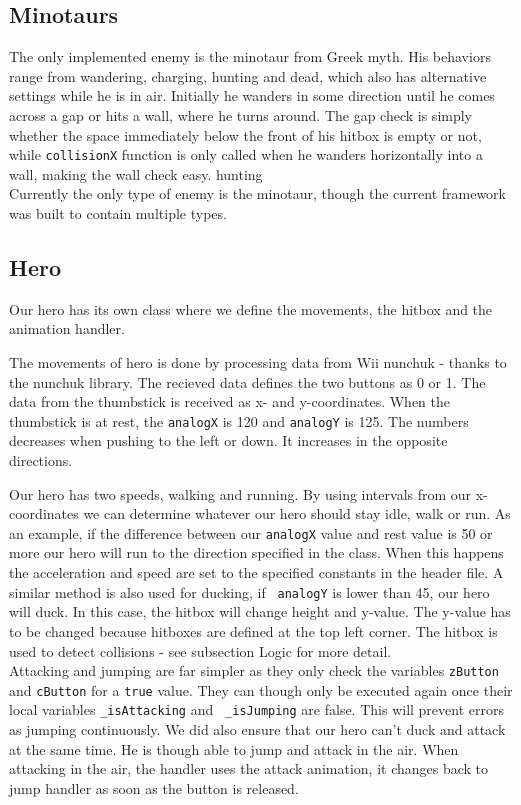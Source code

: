 \subsection{Minotaurs}
The only implemented enemy is the minotaur from Greek myth. His behaviors range from wandering, charging, hunting and dead, which also has alternative settings while he is in air. Initially he wanders in some direction until he comes across a gap or hits a wall, where he turns around. The gap check is simply whether the space immediately below the front of his hitbox is empty or not, while {\tt collisionX} function is only called when he wanders horizontally into a wall, making the wall check easy.
hunting\\
Currently the only type of enemy is the minotaur, though the current framework was built to contain multiple types.


\subsection{Hero}
Our hero has its own class where we define the movements, the hitbox and
the animation handler.

The movements of hero is done by processing data from Wii
nunchuk - thanks to the nunchuk library. The recieved data defines the two
buttons as 0 or 1.  The data from the thumbstick is received as x- and
y-coordinates. When the thumbstick is at rest, the {\tt analogX} is 120 and
{\tt analogY} is 125.  The numbers decreases when pushing to the left or down.
It increases in the opposite directions.

Our hero has two speeds, walking and running. By using intervals from our
x-coordinates we can determine whatever our hero should stay idle, walk or run.
As an example, if the difference between our {\tt analogX} value and rest value
is 50 or more our hero will run to the direction specified in the class. When
this happens the acceleration and speed are set to the specified constants
in the header file.  A similar method is also used for ducking, if {\tt
analogY} is lower than 45, our hero will duck. In this case, the hitbox will
change height and y-value. The y-value has to be changed because hitboxes are
defined at the top left corner. The hitbox is used to detect collisions - see subsection
Logic for more detail.
\\

Attacking and jumping are far simpler as they only check the
variables {\tt zButton} and {\tt cButton} for a {\tt true} value. They can though only
be executed again once their local variables {\tt \_isAttacking} and {\tt
\_isJumping} are false. This will prevent errors as jumping
continuously. We did also ensure that our hero can't duck and attack at the same
time. He is though able to jump and attack in the air. When attacking in the air,
the handler uses the attack animation, it changes back to jump handler as soon as
the button is released.


